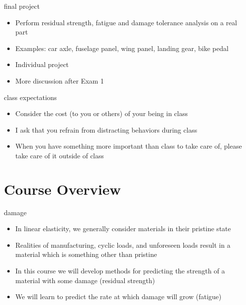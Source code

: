 \documentclass[10pt]{beamer}
\begin{document}
\begin{frame}{final project}
	\begin{itemize}
		\item Perform residual strength, fatigue and damage tolerance analysis on a real part
		\item Examples: car axle, fuselage panel, wing panel, landing gear, bike pedal
		\item Individual project
		\item More discussion after Exam 1
	\end{itemize}
\end{frame}

\begin{frame}{class expectations}
\begin{itemize}
\item Consider the cost (to you or others) of your being in class
\item I ask that you refrain from distracting behaviors during class
\item When you have something more important than class to take care of, please take care of it outside of class
\end{itemize}
\end{frame}

\section{Course Overview}

\begin{frame}{damage}
	\begin{itemize}
		\item In linear elasticity, we generally consider materials in their pristine state
		\item Realities of manufacturing, cyclic loads, and unforeseen loads result in a material which is something other than pristine
		\item In this course we will develop methods for predicting the strength of a material with some damage (residual strength)
		\item We will learn to predict the rate at which damage will grow (fatigue)
	\end{itemize}
\end{frame}
\end{document}
